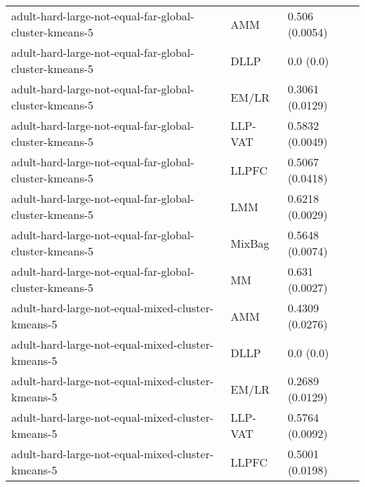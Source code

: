 \begin{longtable}{lll}
                                                       adult-hard-large-not-equal-far-global-cluster-kmeans-5 &       AMM &                            0.506 (0.0054) \\
                                                       adult-hard-large-not-equal-far-global-cluster-kmeans-5 &      DLLP &                                 0.0 (0.0) \\
                                                       adult-hard-large-not-equal-far-global-cluster-kmeans-5 &     EM/LR &                           0.3061 (0.0129) \\
                                                       adult-hard-large-not-equal-far-global-cluster-kmeans-5 &   LLP-VAT &                           0.5832 (0.0049) \\
                                                       adult-hard-large-not-equal-far-global-cluster-kmeans-5 &     LLPFC &                           0.5067 (0.0418) \\
                                                       adult-hard-large-not-equal-far-global-cluster-kmeans-5 &       LMM &                           0.6218 (0.0029) \\
                                                       adult-hard-large-not-equal-far-global-cluster-kmeans-5 &    MixBag &                           0.5648 (0.0074) \\
                                                       adult-hard-large-not-equal-far-global-cluster-kmeans-5 &        MM &                            0.631 (0.0027) \\
                                                            adult-hard-large-not-equal-mixed-cluster-kmeans-5 &       AMM &                           0.4309 (0.0276) \\
                                                            adult-hard-large-not-equal-mixed-cluster-kmeans-5 &      DLLP &                                 0.0 (0.0) \\
                                                            adult-hard-large-not-equal-mixed-cluster-kmeans-5 &     EM/LR &                           0.2689 (0.0129) \\
                                                            adult-hard-large-not-equal-mixed-cluster-kmeans-5 &   LLP-VAT &                           0.5764 (0.0092) \\
                                                            adult-hard-large-not-equal-mixed-cluster-kmeans-5 &     LLPFC &                           0.5001 (0.0198) \\

\end{longtable}
